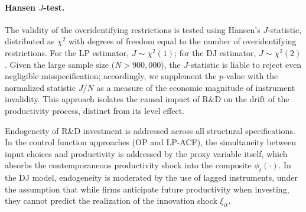 \documentclass[a4paper, 12pt]{article}
\begin{document}
\paragraph{Hansen $J$-test.}
The validity of the overidentifying restrictions is tested using Hansen's $J$-statistic, distributed as $\chi^2$ with degrees of freedom equal to the number of overidentifying restrictions. For the LP estimator, $J \sim \chi^2(1)$; for the DJ estimator, $J \sim \chi^2(2)$. Given the large sample size ($N > 900{,}000$), the $J$-statistic is liable to reject even negligible misspecification; accordingly, we supplement the $p$-value with the normalized statistic $J/N$ as a measure of the economic magnitude of instrument invalidity. This approach isolates the causal impact of R\&D on the drift of the productivity process, distinct from its level effect.


Endogeneity of R\&D investment is addressed across all structural specifications. In the control function approaches (OP and LP-ACF), the simultaneity between input choices and productivity is addressed by the proxy variable itself, which absorbs the contemporaneous productivity shock into the composite $\phi_t(\cdot)$. In the DJ model, endogeneity is moderated by the use of lagged instruments, under the assumption that while firms anticipate future productivity when investing, they cannot predict the realization of the innovation shock $\xi_{it}$.

\end{document}

